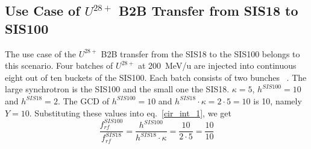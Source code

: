 
\subsection{Use Case of $U^{28+}$ B2B Transfer from SIS18 to SIS100}
\label{sec:cir_no_int}
The use case of the $U^{28+}$ B2B transfer from the SIS18 to the SIS100 belongs to this scenario. Four batches of $U^{28+}$ at \SI{200}{MeV/\atomicmassunit} are injected into continuous eight out of ten buckets of the SIS100. Each batch consists of two bunches ~\cite{liebermann_fair_2013, liebermann_sis100_2013}. The large synchrotron is the SIS100 and the small one the SIS18. $\kappa=5$, $h^{\mathit{SIS100}}=10$ and $h^{\mathit{SIS18}}=2$. %
The GCD of $h^{\mathit{SIS100}}=10$ and $h^{\mathit{SIS18}} \cdot \kappa=2\cdot 5=10$ is 10, namely $Y=10$. Substituting these values into eq.~\ref{cir_int_1}, we get
\begin{equation}
\frac{f_{\mathit{rf}}^{\mathit{SIS100}}}{f_{\mathit{rf}}^{\mathit{SIS18}}}= \frac {h^{\mathit{SIS100}}}{h^{\mathit{SIS18}} \cdot \kappa}= \frac{10}{2 \cdot 5}=\frac{10}{10}
\end{equation}

